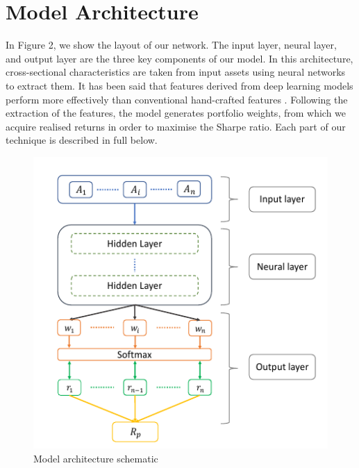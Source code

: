\section{Model Architecture}In Figure 2, we show the layout of our network. The input layer, neural layer, and output layer are the three key components of our model. In this architecture, cross-sectional characteristics are taken from input assets using neural networks to extract them. It has been said that features derived from deep learning models perform more effectively than conventional hand-crafted features \cite{Zhang2020}. Following the extraction of the features, the model generates portfolio weights, from which we acquire realised returns in order to maximise the Sharpe ratio. Each part of our technique is described in full below.
\begin{figure}[H]
    \centering
    \includegraphics{images/Figure 1.png}
    \caption{Model architecture schematic}
    \label{fig:mesh1}
\end{figure}
